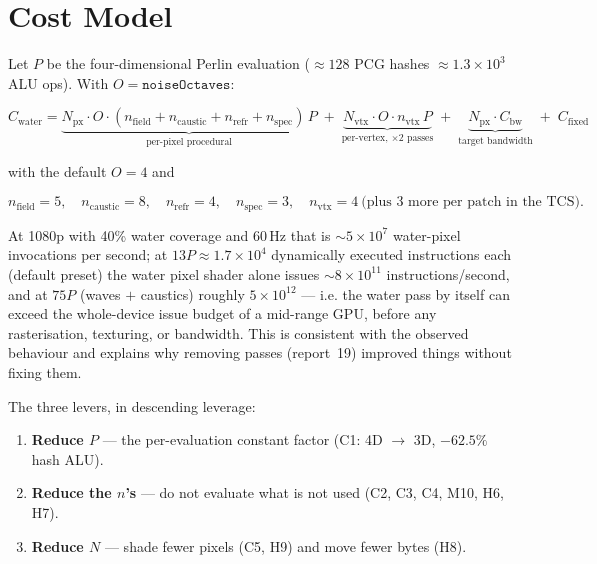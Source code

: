 \documentclass[11pt,a4paper]{article}
\begin{document}
\section{Cost Model}
\label{sec:cost}

Let $P$ be the four-dimensional Perlin evaluation ($\approx 128$ PCG hashes $\approx 1.3\times10^3$ ALU ops). With
$O = \texttt{noiseOctaves}$:

\begin{equation}
C_{\mathrm{water}} = \underbrace{N_{\mathrm{px}} \cdot O \cdot (n_{\mathrm{field}} + n_{\mathrm{caustic}} + n_{\mathrm{refr}} + n_{\mathrm{spec}})\,P}_{\text{per-pixel procedural}}
\;+\; \underbrace{N_{\mathrm{vtx}} \cdot O \cdot n_{\mathrm{vtx}}\,P}_{\text{per-vertex, $\times 2$ passes}}
\;+\; \underbrace{N_{\mathrm{px}} \cdot C_{\mathrm{bw}}}_{\text{target bandwidth}}
\;+\; C_{\mathrm{fixed}}
\end{equation}

with the default $O = 4$ and

\[
n_{\mathrm{field}} = 5,\quad n_{\mathrm{caustic}} = 8,\quad n_{\mathrm{refr}} = 4,\quad n_{\mathrm{spec}} = 3,\quad
n_{\mathrm{vtx}} = 4 \ \text{(plus 3 more per patch in the TCS)}.
\]

At 1080p with 40\% water coverage and 60\,Hz that is $\sim 5\times10^7$ water-pixel invocations per second; at
$13P \approx 1.7\times10^4$ dynamically executed instructions each (default preset) the water pixel shader alone issues
$\sim 8\times10^{11}$ instructions/second, and at $75P$ (waves $+$ caustics) roughly $5\times10^{12}$ --- i.e. the water
pass by itself can exceed the whole-device issue budget of a mid-range GPU, before any rasterisation, texturing, or
bandwidth. This is consistent with the observed behaviour and explains why removing passes (report~19) improved things
without fixing them.

The three levers, in descending leverage:

\begin{enumerate}
    \item \textbf{Reduce $P$} --- the per-evaluation constant factor (C1: 4D $\rightarrow$ 3D, $-62.5\%$ hash ALU).
    \item \textbf{Reduce the $n$'s} --- do not evaluate what is not used (C2, C3, C4, M10, H6, H7).
    \item \textbf{Reduce $N$} --- shade fewer pixels (C5, H9) and move fewer bytes (H8).
\end{enumerate}
\end{document}
